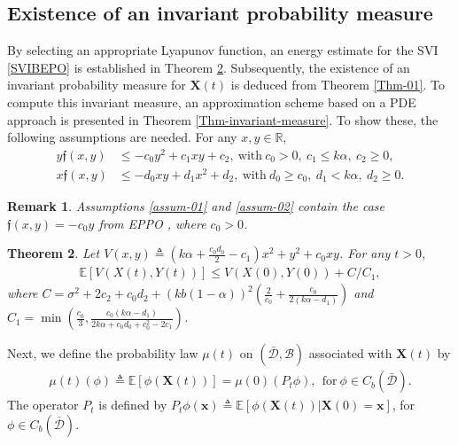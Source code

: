 \documentclass[12pt]{article}
\numberwithin{equation}{section}
\newtheorem{theorem}{Theorem}[section]
\newtheorem{remark}[theorem]{Remark}
\def \R{\mathbb R}
\def \E{\mathbb E}
\begin{document}
\subsection{Existence of an invariant probability measure}
\noindent 
By selecting an appropriate Lyapunov function, 
an energy estimate for the SVI \eqref{SVIBEPO} is established in Theorem \ref{prop-03}. 
Subsequently, the existence of an invariant probability measure for   $\mathbf{X}(t)$ is deduced from Theorem \ref{Thm-01}. 
To compute this invariant measure, 
an approximation scheme based on a PDE approach is presented in Theorem \ref{Thm-invariant-measure}.
To show these, the following assumptions are needed. 
For any $x,y\in\R$, 
\begin{align}
	y\mathfrak{f}(x,y) &\leq - c_{0}y^{2} + c_{1}xy + c_{2}, ~\text{with}~c_{0} >0, ~c_{1}\leq k\alpha, ~c_{2}\geq 0,\label{assum-01}\\
	x\mathfrak{f}(x,y) &\leq -d_{0}xy + d_{1} x^{2} + d_{2}, ~\text{with}~d_{0} \geq c_0, ~d_{1}<k\alpha, ~d_{2}\geq 0. \label{assum-02}
\end{align}

\begin{remark}
	Assumptions \eqref{assum-01} and \eqref{assum-02} contain the case $\mathfrak{f}(x,y) = -c_{0}y$ from EPPO 
	\cite{BMPT09},	where $c_{0}>0$. 
\end{remark}

\begin{theorem}\label{prop-03} 
	Let
	$V(x,y) \triangleq  ( k \alpha + \frac{c_{0}d_{0}}{2} - c_{1} )x^2 + y^2 +  c_0 xy$. 
	For any $t>0$, 
	\begin{align*}
		\mathbb{E} [V(X(t),Y(t))] \leq V(X(0),Y(0)) +C/C_{1}, 
	\end{align*}
	where $C = \sigma^{2} + 2c_{2} + c_{0}d_{2} + (kb(1-\alpha))^{2}\left(\frac{2}{c_{0}} + \frac{c_{0}}{2(k\alpha - d_{1})}\right)$ 
	and 
	$C_{1} = \min\left(\frac{c_{0}}{3}, \frac{c_{0}(k\alpha - d_{1})}{2k\alpha +c_{0}d_{0} + c^{2}_{0} - 2c_{1}}\right)$.
\end{theorem}



Next, we define the probability law $\mu(t)$ on $(\bar{\mathcal{D}}, \mathcal{B})$ associated with $\mathbf{X}(t)$ by
\begin{align*}
	\mu(t)(\phi) \triangleq \E[\phi (\mathbf{X}(t))] = \mu(0) (P_{t}\phi), ~~\text{for}~\phi\in	C_{b}(\bar{\mathcal{D}}). 
\end{align*}
The operator $P_{t}$ is defined by
$P_{t}\phi(\mathbf{x}) \triangleq \E[\phi(\mathbf{X}(t)) | \mathbf{X}(0) = \mathbf{x}]$, 
for $\phi\in	C_{b}(\bar{\mathcal{D}})$. 
\end{document}
